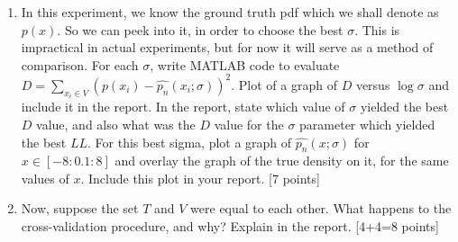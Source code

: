 \documentclass[11pt]{article}
\begin{document}
\begin{enumerate}
\begin{enumerate}
\item In this experiment, we know the ground truth pdf which we shall denote as $p(x)$.  So we can peek into it, in order to choose the best $\sigma$. This is impractical in actual experiments, but for now it will serve as a method of comparison. For each $\sigma$, write MATLAB code to evaluate $D = \sum_{x_i \in V} (p(x_i)-\hat{p_n}(x_i;\sigma))^2$. Plot of a graph of $D$ versus $\log \sigma$ and include it in the report. In the report, state which value of $\sigma$ yielded the best $D$ value, and also what was the $D$ value for the $\sigma$ parameter which yielded the best $LL$. For this best sigma, plot a graph of $\hat{p_n}(x;\sigma)$ for $x \in [-8:0.1:8]$ and overlay the graph of the true density on it, for the same values of $x$. Include this plot in your report. \textsf{[7 points]}
\item Now, suppose the set $T$ and $V$ were equal to each other. What happens to the cross-validation procedure, and why? Explain in the report. \textsf{[4+4=8 points]}
\end{enumerate}

\end{enumerate}
\end{document}
